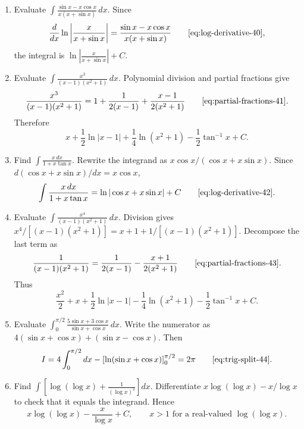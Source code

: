 \begin{enumerate}[label=\theenumi,leftmargin=4mm,itemsep=9pt]
\[\setcounter{enumi}{38}\item Evaluate $\displaystyle\int_0^{\pi/4}\frac{\sin x+\cos x}{3+\sin2x}\,dx$.
\solution Set $u=\sin x-\cos x$, so $du=(\sin x+\cos x)dx$ and $\sin2x=1-u^2$. The limits become $u=-1$ and $u=0$. Hence
\[
I=\int_{-1}^{0}\frac{du}{4-u^2}=\left[\frac14\ln\left|\frac{2+u}{2-u}\right|\right]_{-1}^{0}=\frac14\ln3\qquad\eqref{eq:int-rational-39}.
\]

\setcounter{enumi}{39}\item Evaluate $\displaystyle\int\frac{\sin x-x\cos x}{x(x+\sin x)}\,dx$.
\solution Since
\[
\frac{d}{dx}\ln\left|\frac{x}{x+\sin x}\right|=\frac{\sin x-x\cos x}{x(x+\sin x)}\qquad\eqref{eq:log-derivative-40},
\]
the integral is $\ln\left|\frac{x}{x+\sin x}\right|+C$.

\setcounter{enumi}{40}\item Evaluate $\displaystyle\int\frac{x^3}{(x-1)(x^2+1)}\,dx$.
\solution Polynomial division and partial fractions give
\[
\frac{x^3}{(x-1)(x^2+1)}=1+\frac1{2(x-1)}+\frac{x-1}{2(x^2+1)}\qquad\eqref{eq:partial-fractions-41}.
\]
Therefore
\[
x+\frac12\ln|x-1|+\frac14\ln(x^2+1)-\frac12\tan^{-1}x+C.
\]

\setcounter{enumi}{41}\item Find $\displaystyle\int\frac{x\,dx}{1+x\tan x}$.
\solution Rewrite the integrand as $x\cos x/(\cos x+x\sin x)$. Since $d(\cos x+x\sin x)/dx=x\cos x$,
\[
\int\frac{x\,dx}{1+x\tan x}=\ln|\cos x+x\sin x|+C\qquad\eqref{eq:log-derivative-42}.
\]

\setcounter{enumi}{42}\item Evaluate $\displaystyle\int\frac{x^4}{(x-1)(x^2+1)}\,dx$.
\solution Division gives $x^4/[(x-1)(x^2+1)]=x+1+1/[(x-1)(x^2+1)]$. Decompose the last term as
\[
\frac1{(x-1)(x^2+1)}=\frac1{2(x-1)}-\frac{x+1}{2(x^2+1)}\qquad\eqref{eq:partial-fractions-43}.
\]
Thus
\[
\frac{x^2}{2}+x+\frac12\ln|x-1|-\frac14\ln(x^2+1)-\frac12\tan^{-1}x+C.
\]

\setcounter{enumi}{43}\item Evaluate $\displaystyle\int_0^{\pi/2}\frac{5\sin x+3\cos x}{\sin x+\cos x}\,dx$.
\solution Write the numerator as $4(\sin x+\cos x)+(\sin x-\cos x)$. Then
\[
I=4\int_0^{\pi/2}dx-\left[\ln(\sin x+\cos x)\right]_0^{\pi/2}=2\pi\qquad\eqref{eq:trig-split-44}.
\]

\setcounter{enumi}{44}\item Find $\displaystyle\int\left[\log(\log x)+\frac1{(\log x)^2}\right]dx$.
\solution Differentiate $x\log(\log x)-x/\log x$ to check that it equals the integrand. Hence
\[
x\log(\log x)-\frac{x}{\log x}+C,\qquad x>1\text{ for a real-valued }\log(\log x).
\]

\]
\end{enumerate}
